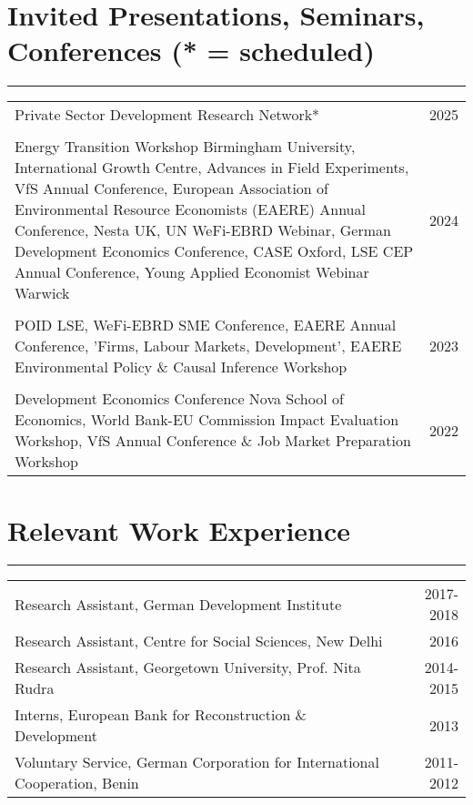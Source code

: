 \documentclass[10pt,a4paper]{article}
\begin{document}
\section*{Invited Presentations, Seminars, Conferences (* = scheduled)}
\hrule
\vspace{1mm}

\begin{tabularx}{\textwidth}{@{}Xr@{}}
Private Sector Development Research Network* & \hfill 2025 \\
\vspace{1mm} \\
Energy Transition Workshop Birmingham University, International Growth Centre, Advances in Field Experiments, VfS Annual Conference, European Association of Environmental Resource Economists (EAERE) Annual Conference, Nesta UK, UN WeFi-EBRD Webinar, German Development Economics Conference, CASE Oxford, LSE CEP Annual Conference, Young Applied Economist Webinar Warwick & \hfill 2024 \\
\vspace{1mm} \\
POID LSE, WeFi-EBRD SME Conference, EAERE Annual Conference, 'Firms, Labour Markets, Development', EAERE Environmental Policy \& Causal Inference Workshop & \hfill 2023 \\
\vspace{1mm} \\
Development Economics Conference Nova School of Economics, World Bank-EU Commission Impact Evaluation Workshop, VfS Annual Conference \& Job Market Preparation Workshop & \hfill 2022 \\
\end{tabularx}



\section*{Relevant Work Experience}
\hrule
\vspace{1mm}

\begin{tabularx}{\textwidth}{@{}Xr@{}} %
Research Assistant, German Development Institute & \hfill 2017-2018 \\
Research Assistant, Centre for Social Sciences, New Delhi & \hfill 2016 \\
Research Assistant, Georgetown University, Prof. Nita Rudra & \hfill 2014-2015 \\
Interns, European Bank for Reconstruction \& Development & \hfill 2013 \\
Voluntary Service, German Corporation for International Cooperation, Benin & \hfill 2011-2012 \\
\end{tabularx}
\end{document}
